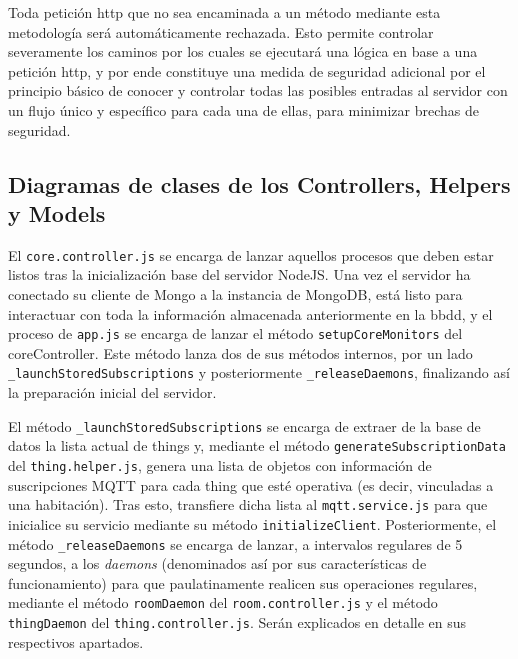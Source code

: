 Toda petición http que no sea encaminada a un método mediante esta metodología será automáticamente rechazada. Esto permite controlar severamente los caminos por los cuales se ejecutará una lógica en base a una petición http, y por ende constituye una medida de seguridad adicional por el principio básico de conocer y controlar todas las posibles entradas al servidor con un flujo único y específico para cada una de ellas, para minimizar brechas de seguridad.

\subsection{Diagramas de clases de los Controllers, Helpers y Models}
\label{makereference4.8.4}

El \verb|core.controller.js| se encarga de lanzar aquellos procesos que deben estar listos tras la inicialización base del servidor NodeJS. Una vez el servidor ha conectado su cliente de Mongo a la instancia de MongoDB, está listo para interactuar con toda la información almacenada anteriormente en la \gls{bbdd}, y el proceso de \verb|app.js| se encarga de lanzar el método \verb|setupCoreMonitors| del coreController. Este método lanza dos de sus métodos internos, por un lado \verb|_launchStoredSubscriptions| y posteriormente \verb|_releaseDaemons|, finalizando así la preparación inicial del servidor.

\vspace{0.5cm}

El método \verb|_launchStoredSubscriptions| se encarga de extraer de la base de datos la lista actual de things y, mediante el método \verb|generateSubscriptionData| del \verb|thing.helper.js|, genera una lista de objetos con información de suscripciones MQTT para cada thing que esté operativa (es decir, vinculadas a una habitación). Tras esto, transfiere dicha lista al \verb|mqtt.service.js| para que inicialice su servicio mediante su método \verb|initializeClient|.
Posteriormente, el método \verb|_releaseDaemons| se encarga de lanzar, a intervalos regulares de 5 segundos, a los \textit{daemons} (denominados así por sus características de funcionamiento) para que paulatinamente realicen sus operaciones regulares, mediante el método \verb|roomDaemon| del \verb|room.controller.js| y el método \verb|thingDaemon| del \verb|thing.controller.js|. Serán explicados en detalle en sus respectivos apartados.

\vspace{1cm}

